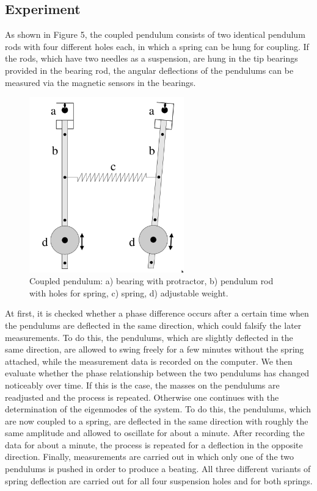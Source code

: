 \documentclass{article}
\begin{document}
\subsection{Experiment}
As shown in Figure 5, the coupled pendulum consists of two identical pendulum rods with four different holes each, in which a spring can be hung for coupling. If the rods, which have two needles as a suspension, are hung in the tip bearings provided in the bearing rod, the angular deflections of the pendulums can be measured via the magnetic sensors in the bearings.
\begin{figure}[hbt!]
\centering
\includegraphics[width=190pt]{coupled-theory.png}\caption{Coupled pendulum: a) bearing with protractor, b) pendulum rod with holes for spring, c) spring, d) adjustable weight. \cite{1}}
\end{figure}
At first, it is checked whether a phase difference occurs after a certain time when the pendulums are deflected in the same direction, which could falsify the later measurements. To do this, the pendulums, which are slightly deflected in the same direction, are allowed to swing freely for a few minutes without the spring attached, while the measurement data is recorded on the computer. We then evaluate whether the phase relationship between the two pendulums has changed noticeably over time. If this is the case, the masses on the pendulums are readjusted and the process is repeated. Otherwise one continues with the determination of the eigenmodes of the system. To do this, the pendulums, which are now coupled to a spring, are deflected in the same direction with roughly the same amplitude and allowed to oscillate for about a minute. After recording the data for about a minute, the process is repeated for a deflection in the opposite direction. Finally, measurements are carried out in which only one of the two pendulums is pushed in order to produce a beating. All three different variants of spring deflection are carried out for all four suspension holes and for both springs.
\end{document}
